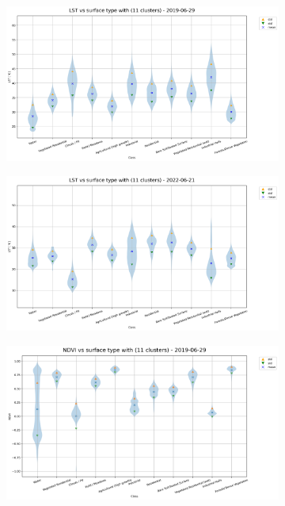 \documentclass[12pt,a4paper, english,twoside]{article}
\begin{document}
   \begin{figure}[!p]
     \begin{subfigure}[b]{\textwidth}
         \centering
         \includegraphics[width=\textwidth]{img/LST vs surface type with (11 clusters) - 2019-06-29.png}
         \label{fig:lstclass01}
     \end{subfigure}
     \begin{subfigure}[b]{\textwidth}
         \centering
         \includegraphics[width=\textwidth]{img/LST vs surface type with (11 clusters) - 2022-06-21.png}
         \label{fig:lstclass02}
     \end{subfigure}
     \begin{subfigure}[b]{\textwidth}
         \centering
         \includegraphics[width=\textwidth]{img/NDVI vs surface type with (11 clusters) - 2019-06-29.png}

\end{subfigure}
\end{figure}
\end{document}

